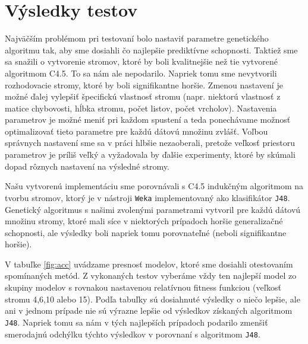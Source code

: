 \section{Výsledky testov}\label{kap5:Results}
Najväčším problémom pri testovaní bolo nastaviť parametre genetického algoritmu tak, aby sme dosiahli čo najlepšie prediktívne schopnosti. Taktiež sme sa snažili o vytvorenie stromov, ktoré by boli kvalitnejšie než tie vytvorené algoritmom C4.5. To sa nám ale nepodarilo. Napriek tomu sme nevytvorili rozhodovacie stromy, ktoré by boli signifikantne horšie. Zmenou nastavení je možné ďalej vylepšiť špecifickú vlastnosť stromu (napr. niektorú vlastnosť z matice chybovosti, hĺbka stromu, počet listov, počet vrcholov). Nastavenia parametrov je možné meniť pri každom spustení a teda ponechávame možnosť optimalizovať tieto parametre pre každú dátovú množinu zvlášť. Voľbou správnych nastavení sme sa v práci hlbšie nezaoberali, pretože veľkosť priestoru parametrov je príliš veľký a vyžadovala by ďalšie experimenty, ktoré by skúmali dopad rôznych nastavení na výsledné stromy.

Našu vytvorenú implementáciu sme porovnávali s C4.5 indukčným algoritmom na tvorbu stromov, ktorý je v nástroji \verb|Weka| implementovaný ako klasifikátor \verb|J48|. Genetický algoritmus s našimi zvolenými parametrami vytvoril pre každú dátovú množinu stromy, ktoré mali síce v niektorých prípadoch horšie generalizačné schopnosti, ale výsledky boli napriek tomu porovnateľné (neboli signifikantne horšie).

V tabuľke \ref{fig:acc} uvádzame presnosť modelov, ktoré sme dosiahli otestovaním spomínaných metód. Z vykonaných testov vyberáme vždy ten najlepší model zo skupiny modelov s rovnakou nastavenou relatívnou fitness funkciou (veľkosť stromu 4,6,10 alebo 15). Podľa tabuľky sú dosiahnuté výsledky o niečo lepšie, ale ani v jednom prípade nie sú výrazne lepšie od výsledkov získaných algoritmom \verb|J48|. Napriek tomu sa nám v tých najlepších prípadoch podarilo zmenšiť smerodajnú odchýlku týchto výsledkov v porovnaní s algoritmom \verb|J48|.

